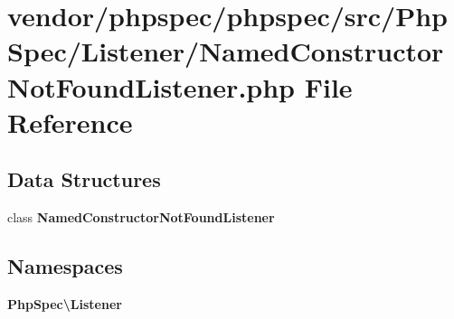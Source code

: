 \section{vendor/phpspec/phpspec/src/\+Php\+Spec/\+Listener/\+Named\+Constructor\+Not\+Found\+Listener.php File Reference}
\label{_named_constructor_not_found_listener_8php}
\subsection*{Data Structures}
\begin{DoxyCompactItemize}
\item 
class {\bf Named\+Constructor\+Not\+Found\+Listener}
\end{DoxyCompactItemize}
\subsection*{Namespaces}
\begin{DoxyCompactItemize}
\item 
 {\bf Php\+Spec\textbackslash{}\+Listener}
\end{DoxyCompactItemize}
